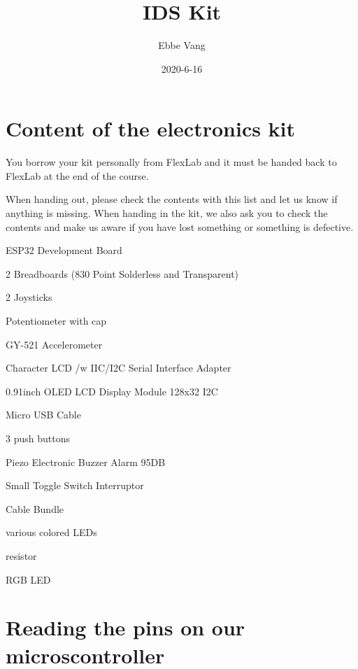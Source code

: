 \documentclass[12pt, a4paper]{article}
\date{2020-6-16}
\author{Ebbe Vang}
\title{IDS Kit}
\begin{document}
\tableofcontents
\newpage
\section{Content of the electronics kit}  

You borrow your kit personally from FlexLab and it must be handed back to
FlexLab at the end of the course.

When handing out, please check the contents with this list and
let us know if anything is missing. When handing in the kit, we also ask
you to check the contents and make us aware if you
have lost something or something is defective.
\begin{todolist}
  \item ESP32 Development Board
  \item 2 Breadboards (830 Point Solderless and Transparent)
  \item 2 Joysticks
  \item Potentiometer with cap
  \item GY-521 Accelerometer 
  \item Character LCD /w IIC/I2C Serial Interface Adapter
  \item 0.91inch OLED LCD Display Module 128x32 I2C 
  \item Micro USB Cable
  \item 3 push buttons
  \item Piezo Electronic Buzzer Alarm 95DB
  \item Small Toggle Switch Interruptor
  \item Cable Bundle
  \item various colored LEDs
  \item resistor
  \item RGB LED
\end{todolist}
\newpage




\newpage
\section{Reading the pins on our microscontroller}
\end{document}
